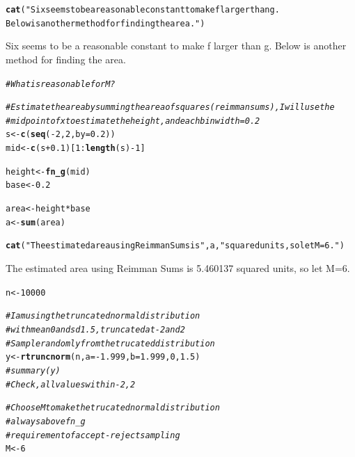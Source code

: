 \documentclass{article}\usepackage[]{graphicx}\usepackage[]{color}
\makeatletter
\newcommand{\hlnum}[1]{\textcolor[rgb]{0.686,0.059,0.569}{#1}}%
\newcommand{\hlstr}[1]{\textcolor[rgb]{0.192,0.494,0.8}{#1}}%
\newcommand{\hlcom}[1]{\textcolor[rgb]{0.678,0.584,0.686}{\textit{#1}}}%
\newcommand{\hlopt}[1]{\textcolor[rgb]{0,0,0}{#1}}%
\newcommand{\hlstd}[1]{\textcolor[rgb]{0.345,0.345,0.345}{#1}}%
\newcommand{\hlkwb}[1]{\textcolor[rgb]{0.69,0.353,0.396}{#1}}%
\newcommand{\hlkwc}[1]{\textcolor[rgb]{0.333,0.667,0.333}{#1}}%
\newcommand{\hlkwd}[1]{\textcolor[rgb]{0.737,0.353,0.396}{\textbf{#1}}}%
\newenvironment{kframe}{%
 \def\at@end@of@kframe{}%
 \ifinner\ifhmode%
  \def\at@end@of@kframe{\end{minipage}}%
  \begin{minipage}{\columnwidth}%
 \fi\fi%
 \def\FrameCommand##1{\hskip\@totalleftmargin \hskip-\fboxsep
 \colorbox{shadecolor}{##1}\hskip-\fboxsep
     \hskip-\linewidth \hskip-\@totalleftmargin \hskip\columnwidth}%
 \MakeFramed {\advance\hsize-\width
   \@totalleftmargin\z@ \linewidth\hsize
   \@setminipage}}%
 {\par\unskip\endMakeFramed%
 \at@end@of@kframe}
\makeatother
\begin{document}
\begin{enumerate}
{}


\begin{kframe}\begin{alltt}
\hlkwd{cat}\hlstd{(}\hlstr{"Six seems to be a reasonable constant to make f larger than g.
    Below is another method for finding the area."}\hlstd{)}
\end{alltt}
\end{kframe}Six seems to be a reasonable constant to make f larger than g.
    Below is another method for finding the area.\begin{kframe}\begin{alltt}
\hlcom{#What is reasonable for M?}

\hlcom{# Estimate the area by summing the area of squares (reimman sums), I will use the }
\hlcom{# mid point of x to estimate the height, and each bin width = 0.2}
\hlstd{s} \hlkwb{<-} \hlkwd{c}\hlstd{(}\hlkwd{seq}\hlstd{(}\hlopt{-}\hlnum{2}\hlstd{,}\hlnum{2}\hlstd{,} \hlkwc{by} \hlstd{=} \hlnum{0.2}\hlstd{))}
\hlstd{mid} \hlkwb{<-} \hlkwd{c}\hlstd{(s}\hlopt{+}\hlnum{0.1}\hlstd{)[}\hlnum{1}\hlopt{:}\hlkwd{length}\hlstd{(s)}\hlopt{-}\hlnum{1}\hlstd{]}

\hlstd{height} \hlkwb{<-} \hlkwd{fn_g}\hlstd{(mid)}
\hlstd{base} \hlkwb{<-} \hlnum{0.2}

\hlstd{area} \hlkwb{<-} \hlstd{height}\hlopt{*}\hlstd{base}
\hlstd{a} \hlkwb{<-} \hlkwd{sum}\hlstd{(area)}

\hlkwd{cat}\hlstd{(}\hlstr{"The estimated area using Reimman Sums is"}\hlstd{, a,} \hlstr{"squared units, so let M=6."}\hlstd{)}
\end{alltt}
\end{kframe}The estimated area using Reimman Sums is 5.460137 squared units, so let M=6.\begin{kframe}\begin{alltt}
\hlstd{n} \hlkwb{<-} \hlnum{10000}

\hlcom{# I am using the truncated normal distribution }
\hlcom{# with mean 0 and sd 1.5, truncated at -2 and 2}
\hlcom{# Sample randomly from the trucated distribution}
\hlstd{y} \hlkwb{<-} \hlkwd{rtruncnorm}\hlstd{(n,}\hlkwc{a}\hlstd{=}\hlopt{-}\hlnum{1.999}\hlstd{,}\hlkwc{b}\hlstd{=}\hlnum{1.999}\hlstd{,}\hlnum{0}\hlstd{,}\hlnum{1.5}\hlstd{)}
\hlcom{# summary(y)}
\hlcom{# Check, all values within -2,2}

\hlcom{# Choose M to make the trucated normal distribution }
\hlcom{# always above fn_g}
\hlcom{# requirement of accept-reject sampling}
\hlstd{M} \hlkwb{<-} \hlnum{6}


\end{alltt}
\end{kframe}
\end{enumerate}
\end{document}
